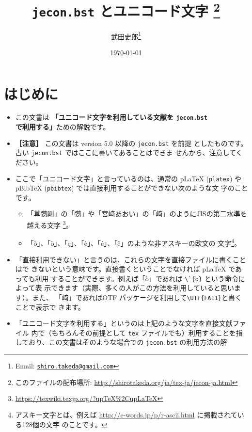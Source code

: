 \documentclass[a4paper,10pt]{bxjsarticle}
\title{\textbf{\texttt{jecon.bst} とユニコード文字}
\thanks{このファイルの配布場所: \url{http://shirotakeda.org/ja/tex-ja/jecon-ja.html}}
}
\author{武田史郎\thanks{Email:
\texttt{\href{mailto:shiro.takeda@gmail.com}{shiro.takeda@gmail.com}}}}
\date{\today}
\begin{document}
\maketitle

\tableofcontents


\section{はじめに}

\begin{itemize}
 \item この文書は \textbf{「ユニコード文字を利用している文献を
       \texttt{jecon.bst} で利用する」}ための解説です。
 \item \textbf{［注意］} この文書は version 5.0 以降の \texttt{jecon.bst} を前提
       としたものです。古い \texttt{jecon.bst} ではここに書いてあることはできま
       せんから、注意してください。
 \item ここで「ユニコード文字」と言っているのは、通常の pLaTeX (\texttt{platex})
       や pBibTeX (\texttt{pbibtex}) では直接利用することができない次のような文
       字のことです。
       \begin{itemize}
        \item 「草彅剛」の「彅」や「宮﨑あおい」の「﨑」のようにJISの第二水準を
	      越える文字
              \footnote{\url{https://texwiki.texjp.org/?upTeX\%2CupLaTeX}}。
        \item 「ò」、「ö」、「ç」、「è」、「é」、「ê」のような非アスキーの欧文の
	      文字\footnote{アスキー文字とは、例えば
	      \url{http://e-words.jp/p/r-ascii.html} に掲載されている128個の文字
	      のことです。}。
       \end{itemize}
 \item 「直接利用できない」と言うのは、これらの文字を直接ファイルに書くことはで
       きないという意味です。直接書くということでなければ pLaTeX であっても利用
       することができます。例えば「ò」であれば \verb|\`{o}| という命令によって表
       示できます（実際、多くの人がこの方法を利用していると思います）。また、
       「﨑」であればOTF パッケージを利用して\verb|\UTF{FA11}|と書くことで表示で
       きます。
 \item 「ユニコード文字を利用する」というのは上記のような文字を直接文献ファイル
       内で（もちろんその前提として \texttt{tex} ファイルでも）利用することを指
       しており、この文書はそのような場合での \texttt{jecon.bst} の利用方法の解

\end{itemize}
\end{document}
